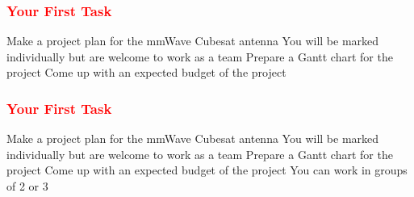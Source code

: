 \documentclass[10pt, compress]{beamer}
\begin{document}
\begin{frame}[fragile]
  \frametitle{\textcolor{red}{Your First Task}}
  \begin{outline}
    \1 Make a project plan for the mmWave Cubesat antenna
    \1 You will be marked individually but are welcome to work as a team
    \1 Prepare a Gantt chart for the project
    \1 Come up with an expected budget of the project
  \end{outline}
\end{frame}
\begin{frame}[fragile]
  \frametitle{\textcolor{red}{Your First Task}}
  \begin{outline}
    \1 Make a project plan for the mmWave Cubesat antenna
    \1 You will be marked individually but are welcome to work as a team
    \1 Prepare a Gantt chart for the project
    \1 Come up with an expected budget of the project
    \1 You can work in groups of 2 or 3
  \end{outline}
\end{frame}
\end{document}
